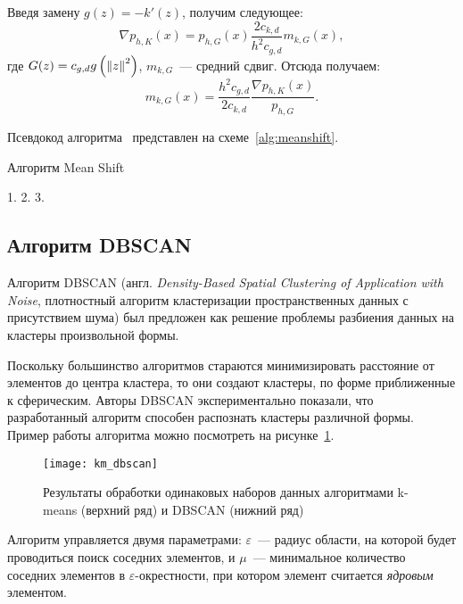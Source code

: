 Введя замену \( g(z) = -k'(z) \), получим следующее:
\[
    \nabla p_{h, K}(x) = p_{h, G}(x)\frac{2c_{k, d}}{h^2c_{g, d}}m_{k, G}(x),
\]
где \( G(z) = c_{g, d} g\left(\left\|z\right\|^2\right) \), \( m_{k, G} \)~--- средний сдвиг. Отсюда получаем:
\[
    m_{k, G}(x) = \frac{h^2c_{g, d}}{2c_{k, d}}\frac{\nabla p_{h, K}(x)}{p_{h, G}}.
\]

Псевдокод алгоритма~\cite[с. 235-236]{algms} представлен на схеме~\ref{alg:meanshift}.
\begin{algorithm}[ht!]
    \caption{Алгоритм Mean Shift}
    1. 
    2. 
    3. 
    \label{alg:meanshift}
\end{algorithm}

\subsection{Алгоритм DBSCAN}
Алгоритм DBSCAN (англ. \emph{Density-Based Spatial Clustering of Application with Noise}, плотностный алгоритм кластеризации пространственных данных с присутствием шума) был предложен как решение проблемы разбиения данных на кластеры произвольной формы.

Поскольку большинство алгоритмов стараются минимизировать расстояние от элементов до центра кластера, то они создают кластеры, по форме приближенные к сферическим. Авторы DBSCAN экспериментально показали, что разработанный алгоритм способен распознать кластеры различной формы. Пример работы алгоритма можно посмотреть на рисунке~\ref{pic:km-dbscan}.

\begin{figure}[tb!]
    \centering
    \texttt{[image: km\_dbscan]}\\[1ex]
    \parbox{.9\textwidth}{\caption{Результаты обработки одинаковых наборов данных алгоритмами k-means (верхний ряд) и DBSCAN (нижний ряд)} \label{pic:km-dbscan}}
\end{figure}

Алгоритм управляется двумя параметрами: \( \varepsilon \)~--- радиус области, на которой будет проводиться поиск соседних элементов, и \( \mu \)~--- минимальное количество соседних элементов в \( \varepsilon \)-окрестности, при котором элемент считается \emph{ядровым} элементом.

